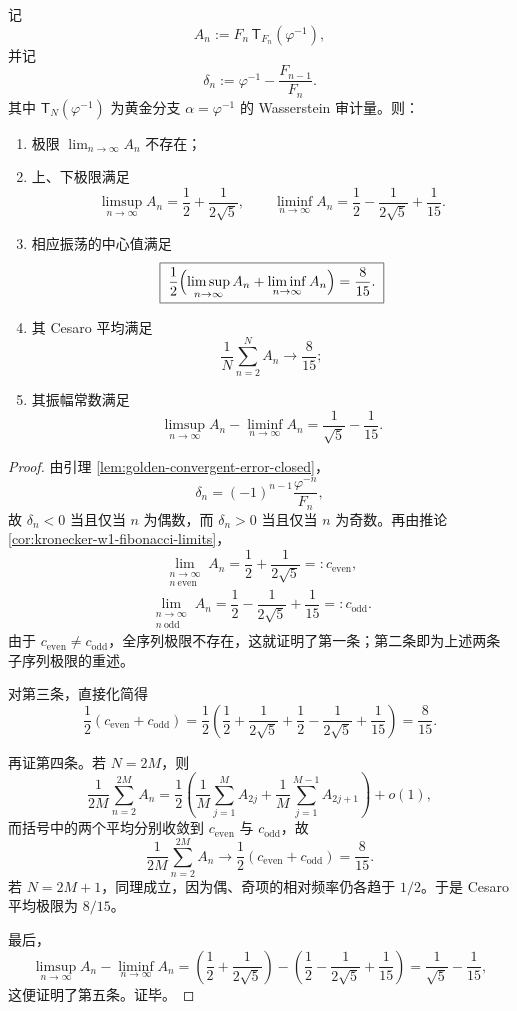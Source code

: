 \begin{theorem}\label{thm:conclusion-golden-fibonacci-audit-two-periodic-rigidity}
记
\[
A_n:=F_n\,\mathsf T_{F_n}(\varphi^{-1}),
\]
并记
\[
\delta_n:=\varphi^{-1}-\frac{F_{n-1}}{F_n}.
\]
其中 \(\mathsf T_N(\varphi^{-1})\) 为黄金分支 \(\alpha=\varphi^{-1}\) 的 Wasserstein 审计量。则：
\begin{enumerate}
  \item 极限 \(\lim_{n\to\infty}A_n\) 不存在；
  \item 上、下极限满足
  \[
  \boxed{\;
  \limsup_{n\to\infty}A_n=\frac12+\frac{1}{2\sqrt5},
  \qquad
  \liminf_{n\to\infty}A_n=\frac12-\frac{1}{2\sqrt5}+\frac1{15}.\;}
  \]
  \item 相应振荡的中心值满足
  \[
  \boxed{\;
  \frac12\Bigl(\limsup_{n\to\infty}A_n+\liminf_{n\to\infty}A_n\Bigr)=\frac{8}{15}.\;}
  \]
  \item 其 Cesaro 平均满足
  \[
  \boxed{\;
  \frac1N\sum_{n=2}^{N}A_n
  \longrightarrow
  \frac{8}{15};\;}
  \]
  \item 其振幅常数满足
  \[
  \boxed{\;
  \limsup_{n\to\infty}A_n-\liminf_{n\to\infty}A_n
  =
  \frac{1}{\sqrt5}-\frac1{15}.\;}
  \]
\end{enumerate}
\end{theorem}
\begin{proof}
由引理 \ref{lem:golden-convergent-error-closed}，
\[
\delta_n=(-1)^{n-1}\frac{\varphi^{-n}}{F_n},
\]
故 \(\delta_n<0\) 当且仅当 \(n\) 为偶数，而 \(\delta_n>0\) 当且仅当 \(n\) 为奇数。再由推论 \ref{cor:kronecker-w1-fibonacci-limits}，
\[
\lim_{\substack{n\to\infty\\ n\ \mathrm{even}}}A_n
=
\frac12+\frac{1}{2\sqrt5}
=: c_{\mathrm{even}},
\]
\[
\lim_{\substack{n\to\infty\\ n\ \mathrm{odd}}}A_n
=
\frac12-\frac{1}{2\sqrt5}+\frac1{15}
=: c_{\mathrm{odd}}.
\]
由于 \(c_{\mathrm{even}}\neq c_{\mathrm{odd}}\)，全序列极限不存在，这就证明了第一条；第二条即为上述两条子序列极限的重述。

对第三条，直接化简得
\[
\frac12(c_{\mathrm{even}}+c_{\mathrm{odd}})
=
\frac12\left(\frac12+\frac{1}{2\sqrt5}+\frac12-\frac{1}{2\sqrt5}+\frac1{15}\right)
=
\frac{8}{15}.
\]

再证第四条。若 \(N=2M\)，则
\[
\frac1{2M}\sum_{n=2}^{2M}A_n
=
\frac12\left(
\frac1M\sum_{j=1}^{M}A_{2j}
+
\frac1M\sum_{j=1}^{M-1}A_{2j+1}
\right)+o(1),
\]
而括号中的两个平均分别收敛到 \(c_{\mathrm{even}}\) 与 \(c_{\mathrm{odd}}\)，故
\[
\frac1{2M}\sum_{n=2}^{2M}A_n\longrightarrow \frac12(c_{\mathrm{even}}+c_{\mathrm{odd}})=\frac{8}{15}.
\]
若 \(N=2M+1\)，同理成立，因为偶、奇项的相对频率仍各趋于 \(1/2\)。于是 Cesaro 平均极限为 \(8/15\)。

最后，
\[
\limsup_{n\to\infty}A_n-\liminf_{n\to\infty}A_n
=
\left(\frac12+\frac{1}{2\sqrt5}\right)-\left(\frac12-\frac{1}{2\sqrt5}+\frac1{15}\right)
=
\frac{1}{\sqrt5}-\frac1{15},
\]
这便证明了第五条。证毕。
\end{proof}

